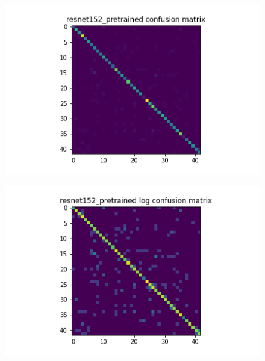 \begin{figure}[t]
  \begin{minipage}[b]{.5\linewidth}
    \centering
    {\includegraphics[width=1.2\textwidth]{figs/conf_matrix/resnet152_pretrained_conf.png}}
  \end{minipage}
  \hfill
  \begin{minipage}[b]{.5\linewidth}
    \centering

    {\includegraphics[width=1.2\textwidth]{figs/conf_matrix/resnet152_pretrained_log_conf.png}}
  \end{minipage}
  \vfill
  \begin{minipage}[b]{.5\linewidth}
    \centering


\end{minipage}
\end{figure}
